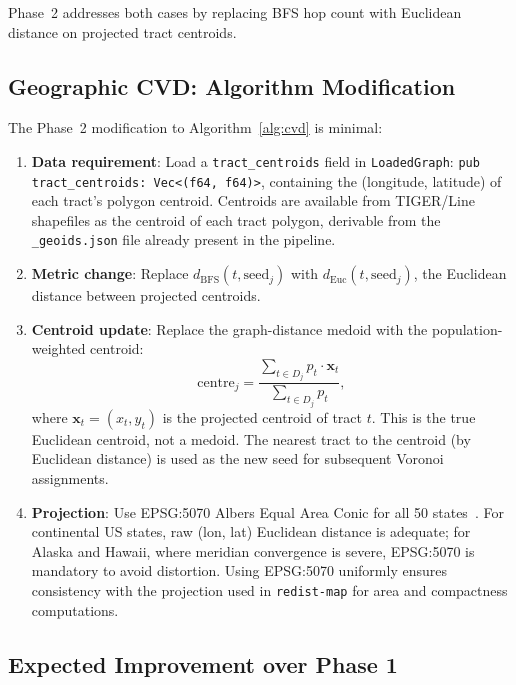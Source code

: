 Phase~2 \cvd{} addresses both cases by replacing BFS hop count with
Euclidean distance on projected tract centroids.

\subsection{Geographic CVD: Algorithm Modification}

The Phase~2 modification to Algorithm~\ref{alg:cvd} is minimal:

\begin{enumerate}
\item \textbf{Data requirement}: Load a \texttt{tract\_centroids} field in
  \texttt{LoadedGraph}: \texttt{pub tract\_centroids: Vec<(f64, f64)>},
  containing the (longitude, latitude) of each tract's polygon centroid.
  Centroids are available from TIGER/Line shapefiles as the centroid of
  each tract polygon, derivable from the \texttt{\_geoids.json} file
  already present in the pipeline.

\item \textbf{Metric change}: Replace $d_{\mathrm{BFS}}(t, \mathrm{seed}_j)$
  with $d_{\mathrm{Euc}}(t, \mathrm{seed}_j)$, the Euclidean distance between
  projected centroids.

\item \textbf{Centroid update}: Replace the graph-distance medoid with the
  population-weighted centroid:
  \[
    \mathrm{centre}_j = \frac{\sum_{t \in D_j} p_t \cdot \mathbf{x}_t}
                             {\sum_{t \in D_j} p_t},
  \]
  where $\mathbf{x}_t = (x_t, y_t)$ is the projected centroid of tract $t$.
  This is the true Euclidean centroid, not a medoid.
  The nearest tract to the centroid (by Euclidean distance) is used as the
  new seed for subsequent Voronoi assignments.

\item \textbf{Projection}: Use EPSG:5070 Albers Equal Area Conic for all
  50 states~\citep{epsg5070}. For continental US states, raw (lon, lat)
  Euclidean distance is adequate; for Alaska and Hawaii, where meridian
  convergence is severe, EPSG:5070 is mandatory to avoid distortion.
  Using EPSG:5070 uniformly ensures consistency with the projection used
  in \texttt{redist-map} for area and compactness computations.
\end{enumerate}

\subsection{Expected Improvement over Phase 1}

